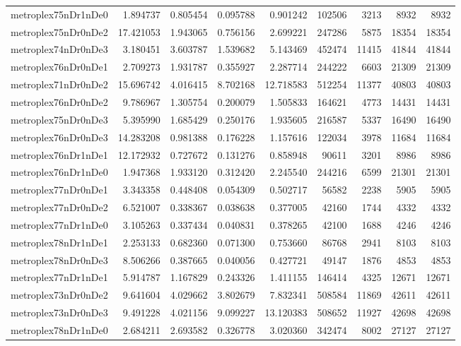 \documentclass[../../../thesis.tex]{subfiles}
\begin{document}
\begin{longtable}{|l|r|r|r|r|r|r|r|r|}
metroplex75nDr1nDe0 & 1.894737 & 0.805454 & 0.095788 & 0.901242 & 102506 & 3213 & 8932 & 8932 \\
metroplex75nDr0nDe2 & 17.421053 & 1.943065 & 0.756156 & 2.699221 & 247286 & 5875 & 18354 & 18354 \\
metroplex74nDr0nDe3 & 3.180451 & 3.603787 & 1.539682 & 5.143469 & 452474 & 11415 & 41844 & 41844 \\
metroplex76nDr0nDe1 & 2.709273 & 1.931787 & 0.355927 & 2.287714 & 244222 & 6603 & 21309 & 21309 \\
metroplex71nDr0nDe2 & 15.696742 & 4.016415 & 8.702168 & 12.718583 & 512254 & 11377 & 40803 & 40803 \\
metroplex76nDr0nDe2 & 9.786967 & 1.305754 & 0.200079 & 1.505833 & 164621 & 4773 & 14431 & 14431 \\
metroplex75nDr0nDe3 & 5.395990 & 1.685429 & 0.250176 & 1.935605 & 216587 & 5337 & 16490 & 16490 \\
metroplex76nDr0nDe3 & 14.283208 & 0.981388 & 0.176228 & 1.157616 & 122034 & 3978 & 11684 & 11684 \\
metroplex76nDr1nDe1 & 12.172932 & 0.727672 & 0.131276 & 0.858948 & 90611 & 3201 & 8986 & 8986 \\
metroplex76nDr1nDe0 & 1.947368 & 1.933120 & 0.312420 & 2.245540 & 244216 & 6599 & 21301 & 21301 \\
metroplex77nDr0nDe1 & 3.343358 & 0.448408 & 0.054309 & 0.502717 & 56582 & 2238 & 5905 & 5905 \\
metroplex77nDr0nDe2 & 6.521007 & 0.338367 & 0.038638 & 0.377005 & 42160 & 1744 & 4332 & 4332 \\
metroplex77nDr1nDe0 & 3.105263 & 0.337434 & 0.040831 & 0.378265 & 42100 & 1688 & 4246 & 4246 \\
metroplex78nDr1nDe1 & 2.253133 & 0.682360 & 0.071300 & 0.753660 & 86768 & 2941 & 8103 & 8103 \\
metroplex78nDr0nDe3 & 8.506266 & 0.387665 & 0.040056 & 0.427721 & 49147 & 1876 & 4853 & 4853 \\
metroplex77nDr1nDe1 & 5.914787 & 1.167829 & 0.243326 & 1.411155 & 146414 & 4325 & 12671 & 12671 \\
metroplex73nDr0nDe2 & 9.641604 & 4.029662 & 3.802679 & 7.832341 & 508584 & 11869 & 42611 & 42611 \\
metroplex73nDr0nDe3 & 9.491228 & 4.021156 & 9.099227 & 13.120383 & 508652 & 11927 & 42698 & 42698 \\
metroplex78nDr1nDe0 & 2.684211 & 2.693582 & 0.326778 & 3.020360 & 342474 & 8002 & 27127 & 27127 \\

\end{longtable}
\end{document}
